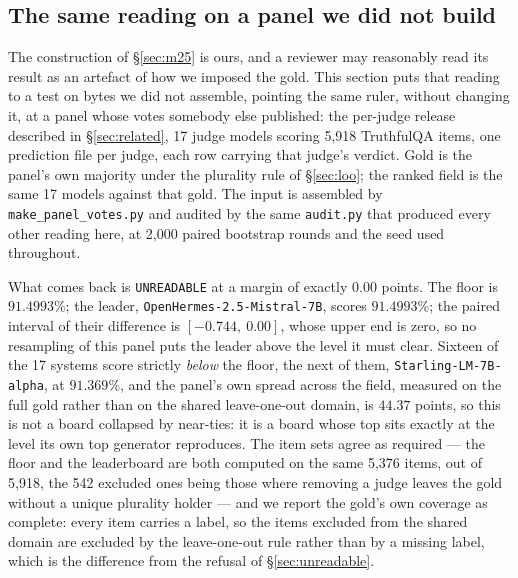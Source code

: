 \documentclass{article}
\newcommand{\ids}[1]{\texttt{\small #1}} %
\begin{document}
\subsection{The same reading on a panel we did not build}
\label{sec:panel} The construction of \S\ref{sec:m25} is ours, and a reviewer may reasonably read its
result as an artefact of how we imposed the gold. This section puts that reading to a test on bytes we did not
assemble, pointing the same
ruler, without changing it, at a panel whose votes somebody else published: the per-judge release
described in \S\ref{sec:related}, 17 judge models scoring 5,918 TruthfulQA items, one prediction file per
judge, each row carrying that judge's verdict. Gold is the panel's own majority under the plurality rule of
\S\ref{sec:loo}; the ranked field is the same 17 models against that gold. The input is assembled by
\ids{make\_panel\_votes.py} and audited by the same \ids{audit.py} that produced every other reading here,
at 2{,}000 paired bootstrap rounds and the seed used throughout.

What comes back is \texttt{UNREADABLE} at a margin of exactly $0.00$ points. The floor is $91.4993\%$; the
leader, \ids{OpenHermes-2.5-Mistral-7B}, scores $91.4993\%$; the paired interval of their difference is
$[-0.744,\ 0.00]$, whose upper end is zero, so no resampling of this panel puts the leader above the level
it must clear. Sixteen of the 17 systems score strictly \emph{below} the floor, the next of them, \ids{Starling-LM-7B-alpha}, at $91.369\%$, and the panel's own spread across the field, measured on the full gold rather than on the shared
leave-one-out domain, is $44.37$ points, so this is not a board collapsed by
near-ties: it is a board whose top sits exactly at the level its own top generator reproduces. The item
sets agree as required --- the floor and the leaderboard are both computed on the same 5,376 items, out of
5,918, the 542 excluded ones being those where removing a judge leaves the gold without a unique plurality
holder --- and we report the gold's own coverage as complete: every item carries a label, so the items excluded
from the shared domain are excluded by the leave-one-out rule rather than by a missing label, which is the
difference from the refusal of \S\ref{sec:unreadable}.
\end{document}
